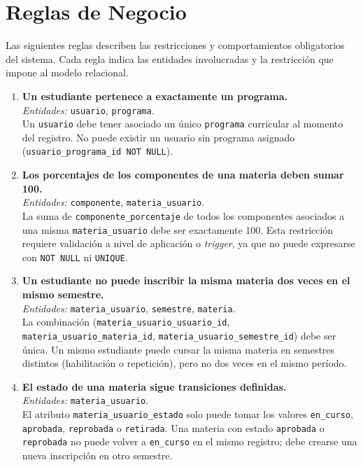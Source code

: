 \documentclass[12pt, letterpaper, twoside]{article}
\begin{document}
\section{Reglas de Negocio}
\label{sec:reglas}

Las siguientes reglas describen las restricciones y comportamientos obligatorios
del sistema. Cada regla indica las entidades involucradas y la restricción que
impone al modelo relacional.

\begin{enumerate}[leftmargin=*, label=\textbf{RN-\arabic*.}]

  \item \textbf{Un estudiante pertenece a exactamente un programa.}\\
  \textit{Entidades:} \texttt{usuario}, \texttt{programa}.\\
  Un \texttt{usuario} debe tener asociado un único \texttt{programa} curricular al
  momento del registro. No puede existir un usuario sin programa asignado
  (\texttt{usuario\_programa\_id NOT NULL}).

  \item \textbf{Los porcentajes de los componentes de una materia deben sumar 100.}\\
  \textit{Entidades:} \texttt{componente}, \texttt{materia\_usuario}.\\
  La suma de \texttt{componente\_porcentaje} de todos los componentes asociados a
  una misma \texttt{materia\_usuario} debe ser exactamente 100. Esta restricción
  requiere validación a nivel de aplicación o \textit{trigger}, ya que no puede
  expresarse con \texttt{NOT NULL} ni \texttt{UNIQUE}.

  \item \textbf{Un estudiante no puede inscribir la misma materia dos veces en el mismo semestre.}\\
  \textit{Entidades:} \texttt{materia\_usuario}, \texttt{semestre}, \texttt{materia}.\\
  La combinación (\texttt{materia\_usuario\_usuario\_id},
  \texttt{materia\_usuario\_materia\_id}, \texttt{materia\_usuario\_semestre\_id})
  debe ser única. Un mismo estudiante puede cursar la misma materia en semestres
  distintos (habilitación o repetición), pero no dos veces en el mismo período.

  \item \textbf{El estado de una materia sigue transiciones definidas.}\\
  \textit{Entidades:} \texttt{materia\_usuario}.\\
  El atributo \texttt{materia\_usuario\_estado} solo puede tomar los valores
  \texttt{en\_curso}, \texttt{aprobada}, \texttt{reprobada} o \texttt{retirada}.
  Una materia con estado \texttt{aprobada} o \texttt{reprobada} no puede volver a
  \texttt{en\_curso} en el mismo registro; debe crearse una nueva inscripción en
  otro semestre.


\end{enumerate}
\end{document}

